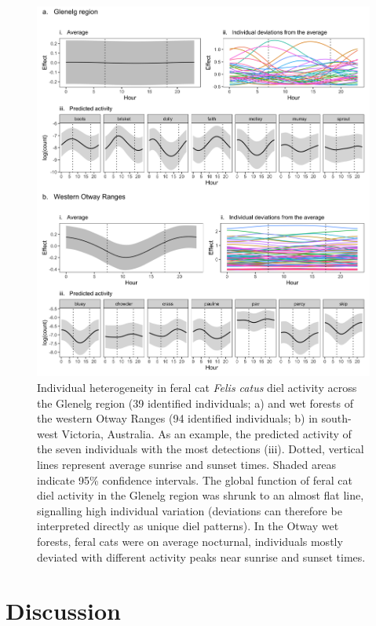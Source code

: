 \documentclass[11pt,a4paper,titlepage,twoside,openright]{style/unimelbthesis}
\begin{document}
\begin{mainmatter}
\begin{figure}
{\centering \includegraphics[width=1\linewidth]{figure/c4/cat_ind} 

}

\caption{Individual heterogeneity in feral cat \textit{Felis catus} diel activity across the Glenelg region (39 identified individuals; a) and wet forests of the western Otway Ranges (94 identified individuals; b) in south-west Victoria, Australia. As an example, the predicted activity of the seven individuals with the most detections (iii). Dotted, vertical lines represent average sunrise and sunset times. Shaded areas indicate 95\% confidence intervals. The global function of feral cat diel activity in the Glenelg region was shrunk to an almost flat line, signalling high individual variation (deviations can therefore be interpreted directly as unique diel patterns). In the Otway wet forests, feral cats were on average nocturnal, individuals mostly deviated with different activity peaks near sunrise and sunset times.}\label{fig:diel-individuals}
\end{figure}
\newpage

\hypertarget{discussion-1}{%
\section{Discussion}\label{discussion-1}}


\end{mainmatter}
\end{document}
